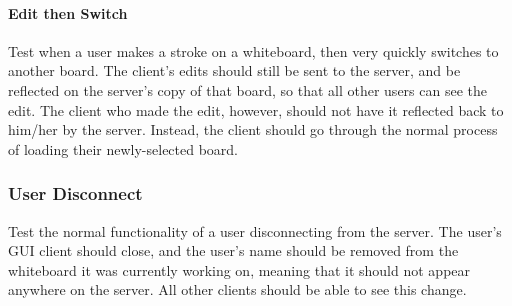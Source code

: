 \paragraph{Edit then Switch}
Test when a user makes a stroke on a whiteboard, then very quickly switches to another board. The client's edits should still be sent to the server, and be reflected on the server's copy of that board, so that all other users can see the edit. The client who made the edit, however, should not have it reflected back to him/her by the server. Instead, the client should go through the normal process of loading their newly-selected board.

\subsubsection{User Disconnect}
Test the normal functionality of a user disconnecting from the server. The user's GUI client should close, and the user's name should be removed from the whiteboard it was currently working on, meaning that it should not appear anywhere on the server. All other clients should be able to see this change.